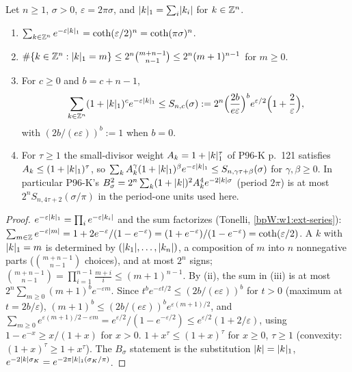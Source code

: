 \begin{lemma}\label{bpW:w1:lattice}
Let $n\ge1$, $\sigma>0$, $\varepsilon=2\pi\sigma$, and $\lvert k\rvert_1=\sum_i\lvert k_i\rvert$ for $k\in\mathbb{Z}^n$.
\begin{enumerate}[label=(\roman*)]
\item $\sum_{k\in\mathbb{Z}^n}e^{-\varepsilon\lvert k\rvert_1}=\coth(\varepsilon/2)^n=\coth(\pi\sigma)^n$.
\item $\#\{k\in\mathbb{Z}^n:\lvert k\rvert_1=m\}\le2^n\binom{m+n-1}{n-1}\le2^n(m+1)^{n-1}$ for $m\ge0$.
\item For $c\ge0$ and $b=c+n-1$,
  \[\sum_{k\in\mathbb{Z}^n}(1+\lvert k\rvert_1)^ce^{-\varepsilon\lvert k\rvert_1}\le S_{n,c}(\sigma):=2^n\Bigl(\frac{2b}{e\varepsilon}\Bigr)^b
  e^{\varepsilon/2}\Bigl(1+\frac2\varepsilon\Bigr),\]
  with $(2b/(e\varepsilon))^b:=1$ when $b=0$.
\item For $\tau\ge1$ the small-divisor weight $A_k=1+\lvert k\rvert_1^\tau$ of P96-K p.~121 satisfies $A_k\le(1+\lvert k\rvert_1)^\tau$,
  so $\sum_kA_k^\gamma(1+\lvert k\rvert_1)^\beta e^{-\varepsilon\lvert k\rvert_1}\le S_{n,\gamma\tau+\beta}(\sigma)$ for
  $\gamma,\beta\ge0$. In particular P96-K's $B_\sigma^2=2^n\sum_k(1+\lvert k\rvert)^2A_k^4e^{-2\lvert k\rvert\sigma}$ (period $2\pi$) is
  at most $2^nS_{n,4\tau+2}(\sigma/\pi)$ in the period-one units used here.
\end{enumerate}
\end{lemma}

\begin{proof}
\label{stepW:w1:latprod}
$e^{-\varepsilon\lvert k\rvert_1}=\prod_ie^{-\varepsilon\lvert k_i\rvert}$ and the sum factorizes (Tonelli,
\ref{bpW:w1:ext-series}): $\sum_{m\in\mathbb{Z}}e^{-\varepsilon\lvert m\rvert}=1+2e^{-\varepsilon}/(1-e^{-\varepsilon})=
(1+e^{-\varepsilon})/(1-e^{-\varepsilon})=\coth(\varepsilon/2)$.
\label{stepW:w1:latcount}
A $k$ with $\lvert k\rvert_1=m$ is determined by $(\lvert k_1\rvert,\dots,\lvert k_n\rvert)$, a composition of $m$ into $n$ nonnegative parts
($\binom{m+n-1}{n-1}$ choices), and at most $2^n$ signs; $\binom{m+n-1}{n-1}=\prod_{i=1}^{n-1}\frac{m+i}i\le(m+1)^{n-1}$.
\label{stepW:w1:latweight}
By (ii), the sum in (iii) is at most $2^n\sum_{m\ge0}(m+1)^be^{-\varepsilon m}$. Since $t^be^{-\varepsilon t/2}\le
(2b/(e\varepsilon))^b$ for $t>0$ (maximum at $t=2b/\varepsilon$), $(m+1)^b\le(2b/(e\varepsilon))^be^{\varepsilon(m+1)/2}$, and
$\sum_{m\ge0}e^{\varepsilon(m+1)/2-\varepsilon m}=e^{\varepsilon/2}/(1-e^{-\varepsilon/2})\le e^{\varepsilon/2}(1+2/\varepsilon)$, using
$1-e^{-x}\ge x/(1+x)$ for $x>0$.
\label{stepW:w1:latdiv}
$1+x^\tau\le(1+x)^\tau$ for $x\ge0$, $\tau\ge1$ (convexity: $(1+x)^\tau\ge1+x^\tau$). The $B_\sigma$ statement is the
substitution $\lvert k\rvert=\lvert k\rvert_1$, $e^{-2\lvert k\rvert\sigma_K}=e^{-2\pi\lvert k\rvert_1(\sigma_K/\pi)}$.
\end{proof}

